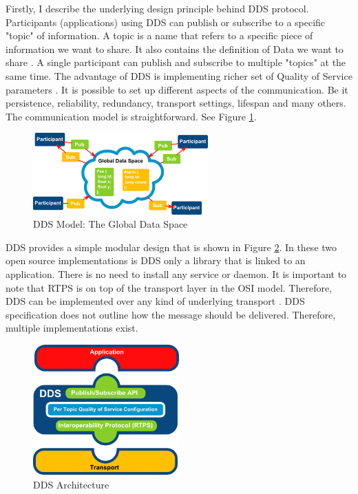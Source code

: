 \documentclass{csfourzero}
\begin{document}
\quad Firstly, I describe the underlying design principle behind DDS protocol. Participants (applications) using DDS can publish or subscribe to a specific "topic" of information. A topic is a name that refers to a specific piece of information we want to share. It also contains the definition of Data we want to share \cite{eprosima-dds}. A single participant can publish and subscribe to multiple "topics" at the same time. The advantage of DDS is implementing richer set of Quality of Service parameters \cite{what-is-dds}. It is possible to set up different aspects of the communication. Be it persistence, reliability, redundancy, transport settings, lifespan and many others. The communication model is straightforward. See Figure \ref{fig:GlobalDataSpace}.

\begin{figure}[h]
	\centering
	\includegraphics[width=0.6\textwidth]{GlobalDataSpace}
	\caption{\label{fig:GlobalDataSpace}DDS Model: The Global Data Space \cite{eprosima-dds}}
\end{figure}

DDS provides a simple modular design that is shown in Figure \ref{fig:DDSArch}. In these two open source implementations is DDS only a library that is linked to an application. There is no need to install any service or daemon. It is important to note that RTPS is on top of the transport layer in the OSI model. Therefore, DDS can be implemented over any kind of underlying transport \cite{eprosima-dds}. DDS specification does not outline how the message should be delivered. Therefore, multiple implementations exist.

\begin{figure}[h]
	\centering
	\includegraphics[width=0.5\textwidth]{DDSArch}
	\caption{\label{fig:DDSArch}DDS Architecture \cite{eprosima-dds}}
\end{figure}
\end{document}
